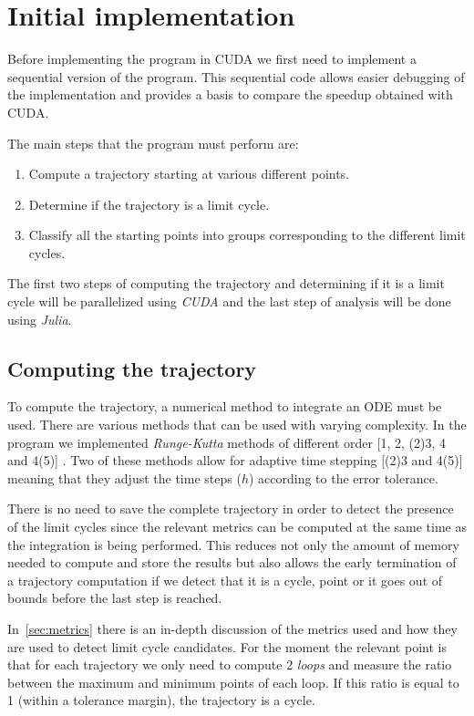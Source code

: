 \pagebreak
\section{Initial implementation}%
\label{sec:initial_implementation}

Before implementing the program in CUDA we first need to implement a sequential version of the program. This sequential code allows easier debugging of the implementation and provides a basis to compare the speedup obtained with CUDA.

The main steps that the program must perform are:

\begin{enumerate}
    \item Compute a trajectory starting at various different points.
    \item Determine if the trajectory is a limit cycle.
    \item Classify all the starting points into groups corresponding to
        the different limit cycles.
\end{enumerate}

The first two steps of computing the trajectory and determining if it is a limit cycle will be parallelized using \emph{CUDA} and the last step of analysis will be done using \emph{Julia}.

\subsection{Computing the trajectory}

To compute the trajectory, a numerical method to integrate an ODE must be used. There are various methods that can be used with varying complexity. In the program we implemented \emph{Runge-Kutta} methods of different order [1, 2, (2)3, 4 and 4(5)] \cite{butcher_numerical_2008}. Two of these methods allow for adaptive time stepping [(2)3 and 4(5)] meaning that they adjust the time steps ($h$) according to the error tolerance.

There is no need to save the complete trajectory in order to detect the presence of the limit cycles since the relevant metrics can be computed at the same time as the integration is being performed. This reduces not only the amount of memory needed to compute and store the results but also allows the early termination of a trajectory computation if we detect that it is a cycle, point or it goes out of bounds before the last step is reached.

In~\cref{sec:metrics} there is an in-depth discussion of the metrics used and how they are used to detect limit cycle candidates. For the moment the relevant point is that for each trajectory we only need to compute 2 \emph{loops} and measure the ratio between the maximum and minimum points of each loop. If this ratio is equal to 1 (within a tolerance margin), the trajectory is a cycle.

